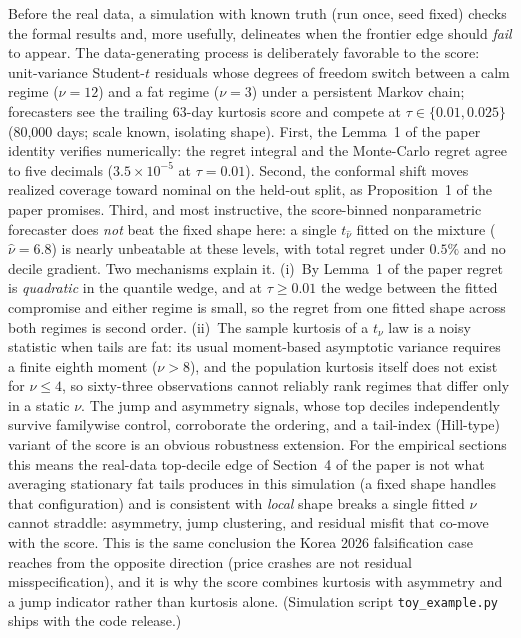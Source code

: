 \documentclass[11pt]{article}
\begin{document}
Before the real data, a simulation with known truth (run once, seed
fixed) checks the formal results and, more usefully, delineates when
the frontier edge should \emph{fail} to appear. The data-generating
process is deliberately favorable to the score: unit-variance
Student-$t$ residuals whose degrees of freedom switch between a calm
regime ($\nu=12$) and a fat regime ($\nu=3$) under a persistent Markov
chain; forecasters see the trailing 63-day kurtosis score and compete
at $\tau \in \{0.01, 0.025\}$ (80{,}000 days; scale known, isolating
shape). First, the Lemma~1 of the paper identity
verifies numerically: the regret integral and the Monte-Carlo regret
agree to five decimals ($3.5\times10^{-5}$ at $\tau=0.01$). Second, the
conformal shift moves realized coverage toward nominal on the held-out
split, as Proposition~1 of the paper promises. Third, and most instructive, the score-binned nonparametric
forecaster does
\emph{not} beat the fixed shape here: a single $t_{\widehat\nu}$
fitted on the mixture ($\widehat\nu = 6.8$) is nearly unbeatable at
these levels, with total regret under $0.5\%$ and no decile gradient.
Two mechanisms explain it. (i)~By
Lemma~1 of the paper regret is \emph{quadratic} in the quantile
wedge, and at $\tau \ge 0.01$ the wedge between the fitted compromise
and either regime is small, so the regret from one fitted shape across
both regimes is second order. (ii)~The sample kurtosis of a $t_\nu$ law is a noisy statistic when
tails are fat: its usual moment-based asymptotic variance requires a
finite eighth moment ($\nu>8$), and the population kurtosis itself does
not exist for $\nu\le4$, so sixty-three observations cannot reliably
rank regimes that differ only in a static $\nu$. The jump and
asymmetry signals, whose top deciles independently survive familywise
control, corroborate the ordering, and a tail-index (Hill-type)
variant of the score is an obvious robustness extension. For the empirical sections this means the real-data top-decile edge of Section~4 of the paper
is not what averaging stationary fat tails produces in this
simulation (a fixed shape handles that configuration) and is consistent with \emph{local} shape breaks a single
fitted $\nu$ cannot straddle: asymmetry, jump clustering, and residual misfit
that co-move with the score. This is the same conclusion the Korea 2026
falsification case reaches from the opposite direction (price crashes
are not residual misspecification), and it is why the score combines
kurtosis with asymmetry and a jump indicator rather than kurtosis
alone. (Simulation script \texttt{toy\_example.py} ships with the code
release.)
\end{document}
